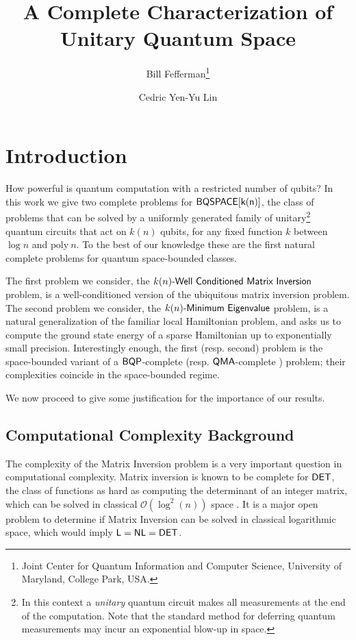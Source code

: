\documentclass[11pt]{article}
\title{A Complete Characterization of Unitary Quantum Space\vspace{-.1in}}%
\author{Bill Fefferman\thanks{Joint Center for Quantum Information and Computer Science, University of Maryland,
College Park, USA.}
\and {Cedric Yen-Yu Lin\samethanks}}
\date{}
\numberwithin{lemma}{section}
\theoremstyle{definition}
\newcommand\BQP{\sf{BQP}}
\newcommand\BQSPACE{\sf{BQSPACE}}
\newcommand\DET{{\sf{DET}}}
\newcommand\Logspace{{\sf{L}}}
\newcommand\NL{{\sf{NL}}}
\newcommand\QMA{{\sf{QMA}}}
\newcommand{\polyn}{\mathrm{poly\:}}
\newcommand\spechamiltonian[1]{#1\textit{\sf{-Minimum Eigenvalue}}}
\newcommand\matrixinversion[1]{#1\textit{\sf{-Well Conditioned Matrix Inversion}}}
\begin{document}
\vspace{-2.0in}
\maketitle
\setcounter{page}{0}
\thispagestyle{empty}
\pagestyle{empty}
\vspace{-.7in}
\section{Introduction}
How powerful is quantum computation with a restricted number of qubits? In this work we give two complete problems for $\BQSPACE[k(n)]$, the class of problems that can be solved by a uniformly generated family of unitary\footnote{In this context a {\emph{unitary}} quantum circuit makes all measurements at the end of the computation.  Note that the standard method for deferring quantum measurements may incur an exponential blow-up in space.} quantum circuits that act on $k(n)$ qubits, for any fixed function $k$ between $\log{n}$ and $\polyn{n}$. To the best of our knowledge these are the first natural complete problems for quantum space-bounded classes.

The first problem we consider, the $\matrixinversion{k(n)}$ problem, is a well-conditioned version of the ubiquitous matrix inversion problem. The second problem we consider, the $\spechamiltonian{k(n)}$ problem, is a natural generalization of the familiar local Hamiltonian problem, and asks us to compute the ground state energy of a sparse Hamiltonian up to exponentially small precision. Interestingly enough, the first (resp. second) problem is the space-bounded variant of a $\BQP$-complete \cite{HHL} (resp. $\QMA$-complete \cite{ksv02}) problem; their complexities coincide in the space-bounded regime.

We now proceed to give some justification for the importance of our results.

\subsection{Computational Complexity Background}
The complexity of the Matrix Inversion problem is a very important question in computational complexity. Matrix inversion is known to be complete for $\DET$, the class of functions as hard as computing the determinant of an integer matrix, which can be solved in classical $\mathcal{O}(\log^{2}(n))$ space \cite{berkowitz, cook}. It is a major open problem to determine if Matrix Inversion can be solved in classical logarithmic space, which would imply $\Logspace=\NL=\DET$.
\end{document}

